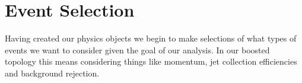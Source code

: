 \chapter{Event Selection} \label{chap:selection}

Having created our physics objects we begin to make selections of what types of
events we want to consider given the goal of our analysis.  In our boosted
topology this means considering things like momentum, jet collection efficiencies and
background rejection.





